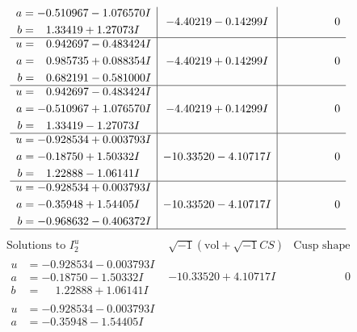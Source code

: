 \documentclass[1p]{elsarticle_modified}
\theoremstyle{definition}
\newcommand{\I}{\sqrt{-1}}
\begin{document}
$$\begin{array}{c|c|c}
\begin{aligned}
a &= -0.510967 - 1.076570 I \\
b &= \phantom{-}1.33419 + 1.27073 I\end{aligned}
 & -4.40219 - 0.14299 I & \phantom{-0.000000 } 0 \\ \hline\begin{aligned}
u &= \phantom{-}0.942697 - 0.483424 I \\
a &= \phantom{-}0.985735 + 0.088354 I \\
b &= \phantom{-}0.682191 - 0.581000 I\end{aligned}
 & -4.40219 + 0.14299 I & \phantom{-0.000000 } 0 \\ \hline\begin{aligned}
u &= \phantom{-}0.942697 - 0.483424 I \\
a &= -0.510967 + 1.076570 I \\
b &= \phantom{-}1.33419 - 1.27073 I\end{aligned}
 & -4.40219 + 0.14299 I & \phantom{-0.000000 } 0 \\ \hline\begin{aligned}
u &= -0.928534 + 0.003793 I \\
a &= -0.18750 + 1.50332 I \\
b &= \phantom{-}1.22888 - 1.06141 I\end{aligned}
 & -10.33520 - 4.10717 I & \phantom{-0.000000 } 0 \\ \hline\begin{aligned}
u &= -0.928534 + 0.003793 I \\
a &= -0.35948 + 1.54405 I \\
b &= -0.968632 - 0.406372 I\end{aligned}
 & -10.33520 - 4.10717 I & \phantom{-0.000000 } 0\\
 \hline 
 \end{array}$$\newpage$$\begin{array}{c|c|c}  
\text{Solutions to }I^u_{2}& \I (\text{vol} + \sqrt{-1}CS) & \text{Cusp shape}\\
 \hline 
\begin{aligned}
u &= -0.928534 - 0.003793 I \\
a &= -0.18750 - 1.50332 I \\
b &= \phantom{-}1.22888 + 1.06141 I\end{aligned}
 & -10.33520 + 4.10717 I & \phantom{-0.000000 } 0 \\ \hline\begin{aligned}
u &= -0.928534 - 0.003793 I \\
a &= -0.35948 - 1.54405 I \\

\end{aligned}
\end{array}$$
\end{document}
